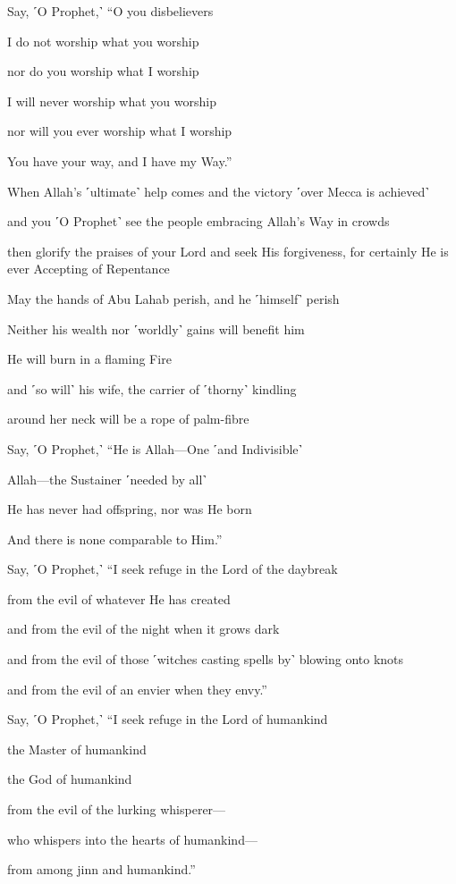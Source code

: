 Say, ˹O Prophet,˺ “O you disbelievers

I do not worship what you worship

nor do you worship what I worship

I will never worship what you worship

nor will you ever worship what I worship

You have your way, and I have my Way.”

When Allah’s ˹ultimate˺ help comes and the victory ˹over Mecca is achieved˺

and you ˹O Prophet˺ see the people embracing Allah’s Way in crowds

then glorify the praises of your Lord and seek His forgiveness, for certainly He is ever Accepting of Repentance

May the hands of Abu Lahab perish, and he ˹himself˺ perish

Neither his wealth nor ˹worldly˺ gains will benefit him

He will burn in a flaming Fire

and ˹so will˺ his wife, the carrier of ˹thorny˺ kindling

around her neck will be a rope of palm-fibre

Say, ˹O Prophet,˺ “He is Allah—One ˹and Indivisible˺

Allah—the Sustainer ˹needed by all˺

He has never had offspring, nor was He born

And there is none comparable to Him.”

Say, ˹O Prophet,˺ “I seek refuge in the Lord of the daybreak

from the evil of whatever He has created

and from the evil of the night when it grows dark

and from the evil of those ˹witches casting spells by˺ blowing onto knots

and from the evil of an envier when they envy.”

Say, ˹O Prophet,˺ “I seek refuge in the Lord of humankind

the Master of humankind

the God of humankind

from the evil of the lurking whisperer—

who whispers into the hearts of humankind—

from among jinn and humankind.”

